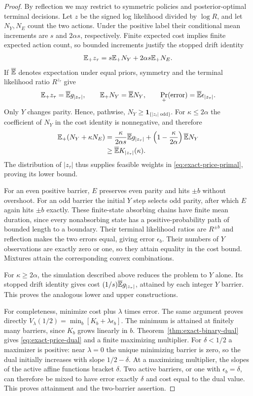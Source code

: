\begin{proof}
By reflection we may restrict to symmetric policies and posterior-optimal
terminal decisions. Let $z$ be the signed log likelihood divided by $\log R$,
and let $N_Y,N_E$ count the two actions. Under the positive label their
conditional mean increments are $s$ and $2\alpha s$, respectively. Finite
expected cost implies finite expected action count, so bounded increments
justify the stopped drift identity
\[
 \mathbb E_+z_\tau=s\mathbb E_+N_Y+2\alpha s\mathbb E_+N_E.
\]
If $\overline{\mathbb E}$ denotes expectation under equal priors, symmetry and
the terminal likelihood ratio $R^{z_\tau}$ give
\[
 \mathbb E_+z_\tau=\overline{\mathbb E} g_{|z_\tau|},\qquad
 \mathbb E_+N_Y=\overline{\mathbb E} N_Y,\qquad
 \Pr_+(\text{error})=\overline{\mathbb E}\epsilon_{|z_\tau|}.
\]
Only $Y$ changes parity. Hence, pathwise,
$N_Y\geq\mathbf1_{\{|z_\tau|\text{ odd}\}}$.
For $\kappa\leq2\alpha$ the coefficient of $N_Y$ in the cost identity is
nonnegative, and therefore
\begin{align*}
 \mathbb E_+(N_Y+\kappa N_E)
 &=\frac{\kappa}{2\alpha s}\overline{\mathbb E} g_{|z_\tau|}
       +\left(1-\frac{\kappa}{2\alpha}\right)\overline{\mathbb E} N_Y\\
 &\geq\overline{\mathbb E} K_{|z_\tau|}(\kappa).
\end{align*}
The distribution of $|z_\tau|$ thus supplies feasible weights in
\eqref{eq:exact-price-primal}, proving its lower bound.

For an even positive barrier, $E$ preserves even parity and hits $\pm b$
without overshoot. For an odd barrier the initial $Y$ step selects odd
parity, after which $E$ again hits $\pm b$ exactly. These finite-state
absorbing chains have finite mean duration, since every nonabsorbing
state has a positive-probability path of bounded length to a boundary.
Their terminal likelihood ratios are $R^{\pm b}$ and reflection makes
the two errors equal, giving error $\epsilon_b$. Their numbers of $Y$
observations are exactly zero or one, so they attain equality in the
cost bound. Mixtures attain the corresponding convex combinations.

For $\kappa\geq2\alpha$, the simulation described above reduces the problem
to $Y$ alone. Its stopped drift identity gives cost
$(1/s)\overline{\mathbb E} g_{|z_\tau|}$, attained by each integer $Y$ barrier.
This proves the analogous lower and upper constructions.

For completeness, minimize cost plus $\lambda$ times error. The same
argument proves directly
$V_\lambda(1/2)=\min_b[K_b+\lambda\epsilon_b]$.
The minimum is attained at finitely many barriers, since $K_b$ grows
linearly in $b$. Theorem~\ref{thm:exact-binary-dual} gives
\eqref{eq:exact-price-dual} and a finite maximizing multiplier.
For $\delta<1/2$ a maximizer is positive: near $\lambda=0$ the unique
minimizing barrier is zero, so the dual initially increases with slope
$1/2-\delta$. At a maximizing multiplier, the slopes of the active
affine functions bracket $\delta$. Two active barriers, or one with
$\epsilon_b=\delta$, can therefore be mixed to have error exactly
$\delta$ and cost equal to the dual value. This proves attainment and
the two-barrier assertion.
\end{proof}

